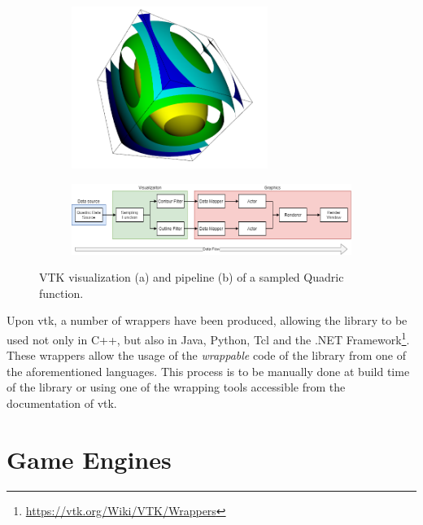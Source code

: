 \begin{figure}[ht!]
    \centering
    \begin{subfigure}{\textwidth}
        \centering
        \includegraphics[width=0.7\textwidth]{pictures/Quadric-Rendering.PNG}
        \caption{}
    \end{subfigure}
    \begin{subfigure}{\textwidth}
        \includegraphics[width=\textwidth]{pictures/Pipeline-VTK-Quadric.png}
        \caption{}
    \end{subfigure}
    \caption{VTK visualization (a) and pipeline (b) of a sampled Quadric function.}
        \label{fig:quadric-render-pipeline}
\end{figure}

Upon \acrshort{vtk}, a number of wrappers have been produced, allowing the library to be used not only in C++, but also in Java, Python, Tcl and the .NET Framework\footnote{\url{https://vtk.org/Wiki/VTK/Wrappers}}. These wrappers allow the usage of the \textit{wrappable} code of the library from one of the aforementioned languages. This process is to be manually done at build time of the library or using one of the wrapping tools accessible from the documentation of \acrshort{vtk}.

\section{Game Engines}

